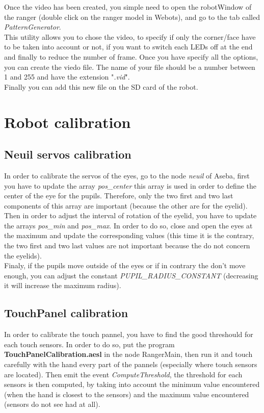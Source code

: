 \documentclass[a4paper,11pt]{report}
\begin{document}
Once the video has been created, you simple need to open the robotWindow of the ranger (double click on the ranger model in Webots), and go to the tab called \textit{PatternGenerator}.\\

This utility allows you to chose the video, to specify if only the corner/face have to be taken into account or not, if you want to switch each LEDs off at the end and finally to reduce the number of frame. Once you have specify all the options, you can create the viedo file. The name of your file should be a number between 1 and 255 and have the extension "\textit{.vid}".\\

Finally you can add this new file on the SD card of the robot.\\

\section{Robot calibration}
\subsection{Neuil servos calibration}
In order to calibrate the servos of the eyes, go to the node \textit{neuil} of Aseba, first you have to update the array \textit{pos\_center} this array is used in order to define the center of the eye for the pupils. Therefore,  only the two first and two last components of this array are important (because the other are for the eyelid).\\

Then in order to adjust the interval of rotation of the eyelid, you have to update the arrays \textit{pos\_min} and \textit{pos\_max}. In order to do so, close and open the eyes at the maximum and update the corresponding values (this time it is the contrary, the two first and two last values are not important because the do not concern the eyelids).\\

Finaly, if the pupils move outside of the eyes or if in contrary the don't move enough, you can adjust the constant \textit{PUPIL\_RADIUS\_CONSTANT} (decreasing it will increase the maximum radius).\\ 

\subsection{TouchPanel calibration}
In order to calibrate the touch pannel, you have to find the good threshould for each touch sensors. In order to do so, put the program \textbf{TouchPanelCalibration.aesl} in the node RangerMain, then run it and touch carefully with the hand every part of the pannels (especially where touch sensors are located). Then emit the event \textit{ComputeThreshold}, the threshold for each sensors is then computed, by taking into account the minimum value encountered (when the hand is closest to the sensors) and the maximum value encountered (sensors do not see had at all).\\
\end{document}
